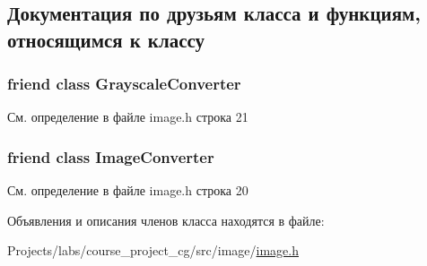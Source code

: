 \subsection{Документация по друзьям класса и функциям, относящимся к классу}
\subsubsection[{\texorpdfstring{Grayscale\+Converter}{GrayscaleConverter}}]{\setlength{\rightskip}{0pt plus 5cm}friend class Grayscale\+Converter\hspace{0.3cm}{\ttfamily [friend]}}\hypertarget{class_image_a655e20b76703bb6a4e6ecd9ed4a5d9ed}{}\label{class_image_a655e20b76703bb6a4e6ecd9ed4a5d9ed}


См. определение в файле image.\+h строка 21

\subsubsection[{\texorpdfstring{Image\+Converter}{ImageConverter}}]{\setlength{\rightskip}{0pt plus 5cm}friend class {\bf Image\+Converter}\hspace{0.3cm}{\ttfamily [friend]}}\hypertarget{class_image_a683b929065aaead03ccce450a7b4ab30}{}\label{class_image_a683b929065aaead03ccce450a7b4ab30}


См. определение в файле image.\+h строка 20



Объявления и описания членов класса находятся в файле\+:\begin{DoxyCompactItemize}
\item 
Projects/labs/course\+\_\+project\+\_\+cg/src/image/\hyperlink{image_8h}{image.\+h}\end{DoxyCompactItemize}
